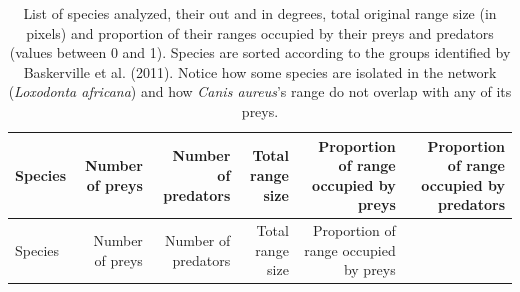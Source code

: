 \documentclass[11pt]{article}
\begin{document}
\hypertarget{tbl:everyone}{}
\begin{longtable}[]{@{}lrrrrr@{}}
\caption{\label{tbl:everyone}List of species analyzed, their out and in
degrees, total original range size (in pixels) and proportion of their
ranges occupied by their preys and predators (values between 0 and 1).
Species are sorted according to the groups identified by Baskerville et
al. (2011). Notice how some species are isolated in the network
(\emph{Loxodonta africana}) and how \emph{Canis aureus}'s range do not
overlap with any of its preys.}\tabularnewline
\toprule
\begin{minipage}[b]{0.28\columnwidth}\raggedright
Species\strut
\end{minipage} & \begin{minipage}[b]{0.10\columnwidth}\raggedleft
Number of preys\strut
\end{minipage} & \begin{minipage}[b]{0.10\columnwidth}\raggedleft
Number of predators\strut
\end{minipage} & \begin{minipage}[b]{0.10\columnwidth}\raggedleft
Total range size\strut
\end{minipage} & \begin{minipage}[b]{0.13\columnwidth}\raggedleft
Proportion of range occupied by preys\strut
\end{minipage} & \begin{minipage}[b]{0.13\columnwidth}\raggedleft
Proportion of range occupied by predators\strut
\end{minipage}\tabularnewline
\midrule
\endfirsthead
\toprule
\begin{minipage}[b]{0.28\columnwidth}\raggedright
Species\strut
\end{minipage} & \begin{minipage}[b]{0.10\columnwidth}\raggedleft
Number of preys\strut
\end{minipage} & \begin{minipage}[b]{0.10\columnwidth}\raggedleft
Number of predators\strut
\end{minipage} & \begin{minipage}[b]{0.10\columnwidth}\raggedleft
Total range size\strut
\end{minipage} & \begin{minipage}[b]{0.13\columnwidth}\raggedleft
Proportion of range occupied by preys\strut
\end{minipage} & \begin{minipage}[b]{0.13\columnwidth}\raggedleft

\end{minipage}
\end{longtable}
\end{document}
